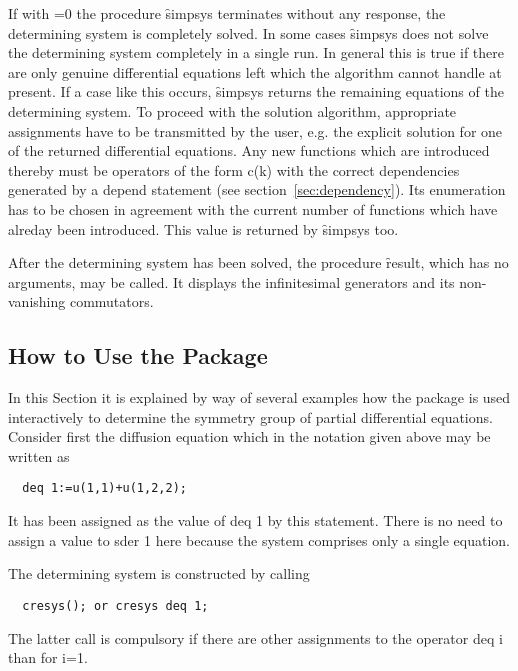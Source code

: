 If with =0 the procedure \f{simpsys} terminates without any
response, the determining system is completely solved.  In some cases
\f{simpsys} does not solve the determining system completely in a single
run. In general this is true if there are only genuine differential
equations left which the algorithm cannot handle at present. If a case
like this occurs, \f{simpsys} returns the remaining equations of the
determining system. To proceed with the solution algorithm,
appropriate assignments have to be transmitted by the user, e.g. the
explicit solution for one of the returned differential equations. Any
new functions which are introduced thereby must be operators of the
form c(k) with the correct dependencies generated by a depend
statement (see section~\ref{sec:dependency}). Its enumeration has to be
chosen in agreement with the current number of functions which have
alreday been introduced.  This value is returned by \f{simpsys} too.

\hypertarget{operator:RESULT}{}
After the determining system has been solved, the procedure \f{result},
which has no arguments, may be called. It displays the infinitesimal
generators and its non-vanishing commutators.


\subsection{How to Use the Package}

In this Section it is explained by way of several examples how the
package  is used interactively to determine the symmetry group of
partial differential equations. Consider first the diffusion equation
which in the notation given above may be written as

\begin{verbatim}
  deq 1:=u(1,1)+u(1,2,2);
\end{verbatim}

It has been assigned as the value of deq 1 by this statement.  There
is no need to assign a value to sder 1 here because the system
comprises only a single equation.

The determining system is constructed by calling

\begin{verbatim}
  cresys(); or cresys deq 1;
\end{verbatim}

The latter call is compulsory if there are other assignments to the
operator deq i than for i=1.

